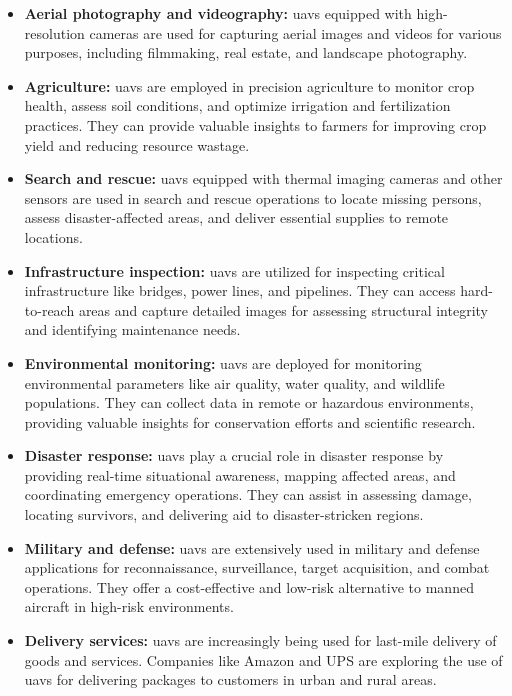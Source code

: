 \begin{itemize}
  \item \textbf{Aerial photography and videography:} \glspl{uav} equipped with high-resolution cameras are used for capturing aerial images and videos for various purposes, including filmmaking, real estate, and landscape photography.

  \item \textbf{Agriculture:} \glspl{uav} are employed in precision agriculture to monitor crop health, assess soil conditions, and optimize irrigation and fertilization practices. They can provide valuable insights to farmers for improving crop yield and reducing resource wastage.

  \item \textbf{Search and rescue:} \glspl{uav} equipped with thermal imaging cameras and other sensors are used in search and rescue operations to locate missing persons, assess disaster-affected areas, and deliver essential supplies to remote locations.

  \item \textbf{Infrastructure inspection:} \glspl{uav} are utilized for inspecting critical infrastructure like bridges, power lines, and pipelines. They can access hard-to-reach areas and capture detailed images for assessing structural integrity and identifying maintenance needs.

  \item \textbf{Environmental monitoring:} \glspl{uav} are deployed for monitoring environmental parameters like air quality, water quality, and wildlife populations. They can collect data in remote or hazardous environments, providing valuable insights for conservation efforts and scientific research.

  \item \textbf{Disaster response:} \glspl{uav} play a crucial role in disaster response by providing real-time situational awareness, mapping affected areas, and coordinating emergency operations. They can assist in assessing damage, locating survivors, and delivering aid to disaster-stricken regions.

  \item \textbf{Military and defense:} \glspl{uav} are extensively used in military and defense applications for reconnaissance, surveillance, target acquisition, and combat operations. They offer a cost-effective and low-risk alternative to manned aircraft in high-risk environments.

    \item \textbf{Delivery services:} \glspl{uav} are increasingly being used for last-mile delivery of goods and services. Companies like Amazon and UPS are exploring the use of \glspl{uav} for delivering packages to customers in urban and rural areas.
\end{itemize}
